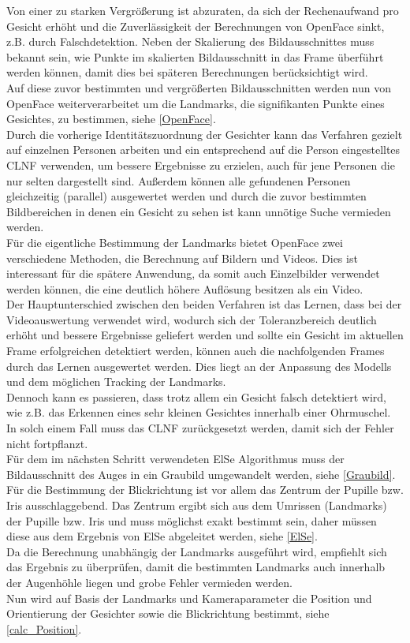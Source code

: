 Von einer zu starken Vergrößerung ist abzuraten, da sich der Rechenaufwand pro Gesicht erhöht und die Zuverlässigkeit der Berechnungen von OpenFace sinkt, z.B. durch Falschdetektion. Neben der Skalierung des Bildausschnittes muss bekannt sein, wie Punkte im skalierten Bildausschnitt in das Frame überführt werden können, damit dies bei späteren Berechnungen berücksichtigt wird.\\
Auf diese zuvor bestimmten und vergrößerten Bildausschnitten werden nun von OpenFace weiterverarbeitet um die Landmarks, die signifikanten Punkte eines Gesichtes, zu bestimmen, siehe \autoref{OpenFace}.\\
Durch die vorherige Identitätszuordnung der Gesichter kann das Verfahren gezielt auf einzelnen Personen arbeiten und ein entsprechend auf die Person eingestelltes CLNF verwenden, um bessere Ergebnisse zu erzielen, auch für jene Personen die nur selten dargestellt sind. Außerdem können alle gefundenen Personen gleichzeitig (parallel) ausgewertet werden und durch die zuvor bestimmten Bildbereichen in denen ein Gesicht zu sehen ist kann unnötige Suche vermieden werden.\\
Für die eigentliche Bestimmung der Landmarks bietet OpenFace zwei verschiedene Methoden, die Berechnung auf Bildern und Videos. Dies ist interessant für die spätere Anwendung, da somit auch Einzelbilder verwendet werden können, die eine deutlich höhere Auflösung besitzen als ein Video.\\
Der Hauptunterschied zwischen den beiden Verfahren ist das Lernen, dass bei der Videoauswertung verwendet wird, wodurch sich der Toleranzbereich deutlich erhöht und bessere Ergebnisse geliefert werden und sollte ein Gesicht im aktuellen Frame erfolgreichen detektiert werden, können auch die nachfolgenden Frames durch das Lernen ausgewertet werden. Dies liegt an der Anpassung des Modells und dem möglichen Tracking der Landmarks.\\
Dennoch kann es passieren, dass trotz allem ein Gesicht falsch detektiert wird, wie z.B. das Erkennen eines sehr kleinen Gesichtes innerhalb einer Ohrmuschel. In solch einem Fall muss das CLNF zurückgesetzt werden, damit sich der Fehler nicht fortpflanzt.\\
Für dem im nächsten Schritt verwendeten ElSe Algorithmus muss der Bildausschnitt des Auges in ein Graubild umgewandelt werden, siehe \autoref{Graubild}.\\
Für die Bestimmung der Blickrichtung ist vor allem das Zentrum der Pupille bzw. Iris ausschlaggebend. Das Zentrum ergibt sich aus dem Umrissen (Landmarks) der Pupille bzw. Iris und muss möglichst exakt bestimmt sein, daher müssen diese aus dem Ergebnis von ElSe abgeleitet werden, siehe \autoref{ElSe}.\\
Da die Berechnung unabhängig der Landmarks ausgeführt wird, empfiehlt sich das Ergebnis zu überprüfen, damit die bestimmten Landmarks auch innerhalb der Augenhöhle liegen und grobe Fehler vermieden werden.\\
Nun wird auf Basis der Landmarks und Kameraparameter die Position und Orientierung der Gesichter sowie die Blickrichtung bestimmt, siehe \autoref{calc_Position}.
